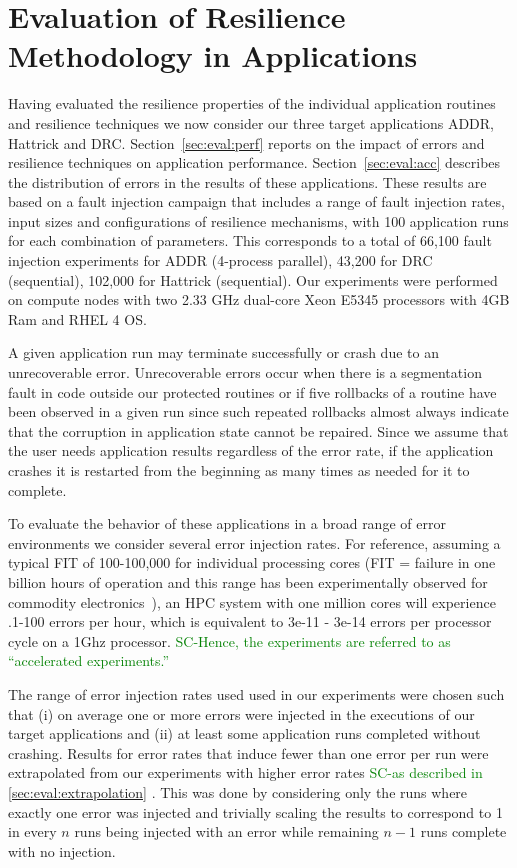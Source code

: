 \documentclass{sig-alternate}
\newcommand{\sui}[1]{%
  \textcolor{green}{SC-#1}
}
\begin{document}
\section{Evaluation of Resilience Methodology in Applications}
\label{sec:eval}

Having evaluated the resilience properties of the individual application routines and resilience techniques we now consider our three target applications ADDR, Hattrick and DRC.
Section~\ref{sec:eval:perf} reports on the impact of errors and resilience techniques on application performance. Section~\ref{sec:eval:acc} describes the distribution of errors in the results of these applications.
These results are based on a fault injection campaign that includes a range of fault injection rates, input sizes and configurations of resilience mechanisms, with 100 application runs for each combination of parameters.
This corresponds to a total of 66,100 fault injection experiments for ADDR (4-process parallel), 43,200 for DRC (sequential), 102,000 for Hattrick (sequential).
Our experiments were performed on compute nodes with two 2.33 GHz dual-core Xeon E5345 processors with 4GB Ram and RHEL 4 OS.

A given application run may terminate successfully or crash due to an unrecoverable error.
Unrecoverable errors occur when there is a segmentation fault in code outside our protected routines or if five rollbacks of a routine have been observed in a given run since such repeated rollbacks almost always indicate that the corruption in application state cannot be repaired.
Since we assume that the user needs application results regardless of the error rate, if the application crashes it is restarted from the beginning as many times as needed for it to complete.

To evaluate the behavior of these applications in a broad range of error environments we consider several error injection rates.
For reference, assuming a typical FIT of 100-100,000 for individual processing cores (FIT = failure in one billion hours of operation and this range has been experimentally observed for commodity electronics~\cite{mem_errors:2010, dram_error:2009}), an HPC system with one million cores will experience .1-100 errors per hour, which is equivalent to 3e-11 - 3e-14 errors per processor cycle on a 1Ghz processor. \sui{Hence, the experiments are referred to as ``accelerated experiments.''}
The range of error injection rates used used in our experiments were chosen such that (i) on average one or more errors were injected in the executions of our target applications and (ii) at least some application runs completed without crashing.
Results for error rates that induce fewer than one error per run were extrapolated from our experiments with higher error rates \sui{as described in \ref{sec:eval:extrapolation}}.
This was done by considering only the runs where exactly one error was injected and trivially scaling the results to correspond to 1 in every $n$ runs being injected with an error while remaining $n-1$ runs complete with no injection.\\
\end{document}
